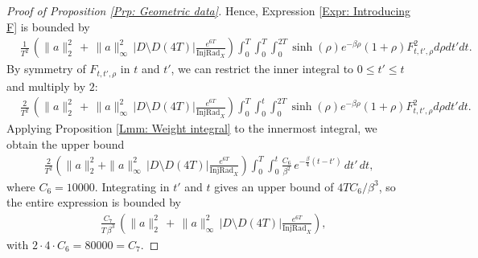 \documentclass[10pt,a4paper]{amsart}
\begin{document}
\begin{proof}[Proof of Proposition \ref{Prp: Geometric data}]
Hence, Expression \eqref{Expr: Introducing F} is bounded by
\begin{align*}
	&
	\frac{1}{ T^{2}}  \,  \left( \| a \|_{2}^{2} \, + \,  \| a \|_{\infty}^{2} \, | D \setminus D( 4T ) | \frac{e^{6T}}{ \operatorname{InjRad}_{X} } \right)\int_{0}^{T} \int_{0}^{T} \int_{0}^{2T} \sinh( \rho ) e^{-\beta \rho} ( 1 + \rho ) F_{t,t', \rho}^{2} d\rho dt' dt.
\end{align*} 
By symmetry of $ F_{t,t',\rho} $ in $ t $ and $ t' $, we can restrict the inner integral to $ 0 \le t' \le t $ and multiply by $ 2 $:
\begin{align*}
	&
	\frac{2}{ T^{2}} \, \left( \| a \|_{2}^{2} \, + \, \| a \|_{\infty}^{2} \, | D \setminus D( 4T ) | \frac{e^{6T }}{ \operatorname{InjRad}_{X} } \right)\int_{0}^{T} \int_{0}^{t} \int_{0}^{2T} \sinh( \rho ) e^{ -\beta \rho } ( 1 + \rho ) F_{t,t', \rho}^{2} d\rho dt' dt.
\end{align*}
Applying Proposition \ref{Lmm: Weight integral} to the innermost integral, we obtain the upper bound
\begin{align*}
\frac{2}{T^{2}} \left( \| a \|_{2}^{2} + \| a \|_{\infty}^{2} \, | D \setminus D( 4T ) | \frac{e^{6T}}{\operatorname{InjRad}_{X}} \right)
\int_{0}^{T} \int_{0}^{t} \frac{C_{6}}{\beta^{2}} \, e^{- \frac{\beta}{4}(t-t')} \, dt' \, dt,
\end{align*}
where \(C_{6} = 10000\).
Integrating in $ t' $ and $ t $ gives an upper bound of $ 4T C_{6} / \beta^{3} $, so the entire expression is bounded by
\begin{align*}
	&
	\frac{C_{7}}{T \, \beta^{3}} \, \left( \| a \|_{2}^{2} \, + \, \| a \|_{\infty}^{2} \, | D \setminus D( 4T ) | \frac{e^{6 T}}{ \operatorname{InjRad}_{X} } \right),
\end{align*}
with $2 \cdot 4 \cdot C_{6} = 80000 = C_{7}$.

\end{proof}
\end{document}
